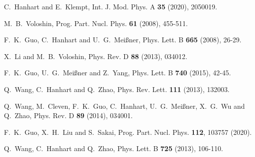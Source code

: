 \documentclass[preprint,12pt,3p]{elsarticle}
\begin{document}
\begin{thebibliography}{99}
C.~Hanhart and E.~Klempt,
Int. J. Mod. Phys. A \textbf{35} (2020), 2050019.

M.~B.~Voloshin,
Prog. Part. Nucl. Phys. \textbf{61} (2008), 455-511.

F.~K.~Guo, C.~Hanhart and U.~G.~Mei\ss ner,
Phys. Lett. B \textbf{665} (2008), 26-29.

X.~Li and M.~B.~Voloshin,
Phys. Rev. D \textbf{88} (2013), 034012.

F.~K.~Guo, U.~G.~Mei\ss{}ner and Z.~Yang,
Phys. Lett. B \textbf{740} (2015), 42-45.

Q.~Wang, C.~Hanhart and Q.~Zhao,
Phys. Rev. Lett. \textbf{111} (2013), 132003.

Q.~Wang, M.~Cleven, F.~K.~Guo, C.~Hanhart, U.~G.~Mei\ss{}ner, X.~G.~Wu and Q.~Zhao,
Phys. Rev. D \textbf{89} (2014), 034001.

F.~K.~Guo, X.~H.~Liu and S.~Sakai,
Prog. Part. Nucl. Phys. \textbf{112}, 103757 (2020).

Q.~Wang, C.~Hanhart and Q.~Zhao,
Phys. Lett. B \textbf{725} (2013), 106-110.


\end{thebibliography}
\end{document}
